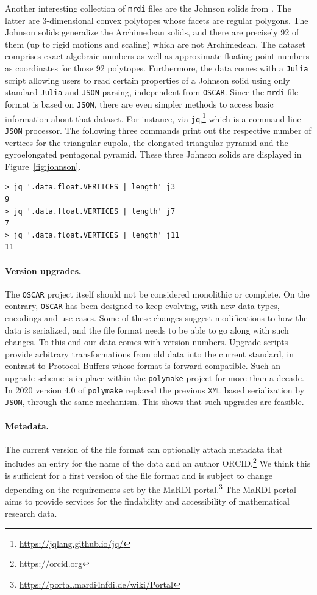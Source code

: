 \documentclass[runningheads]{llncs}
\newcommand\polymake{\texttt{polymake}\xspace}
\newcommand\OSCAR{\texttt{OSCAR}\xspace}
\newcommand\Julia{\texttt{Julia}\xspace}
\newcommand\JSON{\texttt{JSON}\xspace}
\newcommand\XML{\texttt{XML}\xspace}
\begin{document}
Another interesting collection of \texttt{mrdi} files are the Johnson solids from \cite{geiselmann_2024_10729583}.
The latter are 3-dimensional convex polytopes whose facets are regular polygons.
The Johnson solids generalize the Archimedean solids, and there are precisely 92 of them (up to rigid motions and scaling) which are not Archimedean.
The dataset \cite{geiselmann_2024_10729583} comprises exact algebraic numbers as well as approximate floating point numbers as coordinates for those 92 polytopes.
Furthermore, the data comes with a \Julia script allowing users to read certain properties of a Johnson solid using only standard \Julia and \JSON parsing, independent from \OSCAR.
Since the \texttt{mrdi} file format is based on \JSON, there are even simpler methods to access basic information about that dataset.
For instance, via \texttt{jq},\footnote{\url{https://jqlang.github.io/jq/}} which is a command-line \JSON processor.
The following three commands print out the respective number of vertices for the triangular cupola, the elongated triangular pyramid and the gyroelongated pentagonal pyramid.
These three Johnson solids are displayed in Figure~\ref{fig:johnson}.
\begin{verbatim}
> jq '.data.float.VERTICES | length' j3
9
> jq '.data.float.VERTICES | length' j7
7
> jq '.data.float.VERTICES | length' j11
11
\end{verbatim}

\paragraph{Version upgrades.}
The \OSCAR project itself should not be considered monolithic or complete.
On the contrary, \OSCAR has been designed to keep evolving, with new data types, encodings and use cases.
Some of these changes suggest modifications to how the data is serialized, and the file format needs to be able to go along with such changes.
To this end our data comes with version numbers.
Upgrade scripts provide arbitrary transformations from old data into the current standard, in contrast to Protocol Buffers whose format
is forward compatible.
Such an upgrade scheme is in place within the \polymake project for more than a decade.
In 2020 version 4.0 of \polymake replaced the previous \XML based serialization by \JSON, through the same mechanism.
This shows that such upgrades are feasible.

\paragraph{Metadata.}
The current version of the file format can optionally attach metadata that includes an entry for the name of the data and an author ORCID.\footnote{\url{https://orcid.org}} We think this is sufficient for a first version of the file format and is subject to change depending on the requirements set by the MaRDI portal.\footnote{\url{https://portal.mardi4nfdi.de/wiki/Portal}} The MaRDI portal aims to provide services for the findability and accessibility of mathematical research data.
\end{document}
